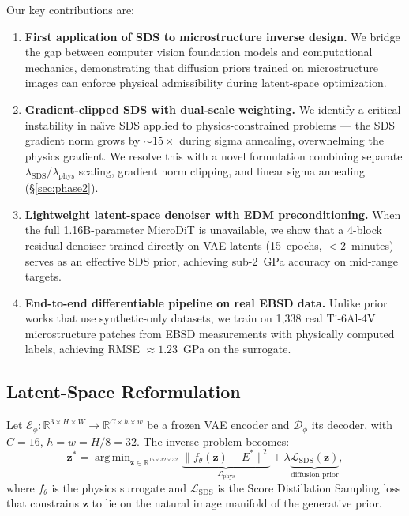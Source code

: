 \documentclass[12pt,a4paper]{article}
\newcommand{\R}{\mathbb{R}}
\newcommand{\loss}{\mathcal{L}}
\newcommand{\Etar}{E^{*}}
\newcommand{\zvec}{\bm{z}}
\DeclareMathOperator*{\argmin}{arg\,min}
\theoremstyle{definition}
\begin{document}
Our key contributions are:
\begin{enumerate}[nosep]
  \item \textbf{First application of SDS to microstructure inverse design.}
    We bridge the gap between computer vision foundation models and
    computational mechanics, demonstrating that diffusion priors trained
    on microstructure images can enforce physical admissibility during
    latent-space optimization.

  \item \textbf{Gradient-clipped SDS with dual-scale weighting.}
    We identify a critical instability in na\"{\i}ve SDS applied to
    physics-constrained problems --- the SDS gradient norm grows by
    $\sim\!15\times$ during sigma annealing, overwhelming the physics
    gradient.  We resolve this with a novel formulation combining
    separate $\lambda_{\mathrm{SDS}} / \lambda_{\mathrm{phys}}$ scaling,
    gradient norm clipping, and linear sigma annealing
    (\S\ref{sec:phase2}).

  \item \textbf{Lightweight latent-space denoiser with EDM preconditioning.}
    When the full 1.16B-parameter MicroDiT is unavailable, we show that
    a 4-block residual denoiser trained directly on VAE latents (15~epochs,
    $<$2~minutes) serves as an effective SDS prior, achieving
    sub-2~GPa accuracy on mid-range targets.

  \item \textbf{End-to-end differentiable pipeline on real EBSD data.}
    Unlike prior works that use synthetic-only datasets, we train on
    1{,}338 real Ti-6Al-4V microstructure patches from EBSD measurements
    with physically computed labels, achieving RMSE $\approx 1.23$~GPa
    on the surrogate.
\end{enumerate}

\subsection{Latent-Space Reformulation}

Let $\mathcal{E}_\phi : \R^{3 \times H \times W} \to \R^{C \times h \times w}$
be a frozen VAE encoder and $\mathcal{D}_\phi$ its decoder, with
$C=16$, $h=w=H/8=32$.  The inverse problem becomes:
\begin{equation}
  \zvec^{*} = \argmin_{\zvec \in \R^{16 \times 32 \times 32}}
  \underbrace{\bigl\| f_\theta(\zvec) - \Etar \bigr\|^2}_{\loss_{\mathrm{phys}}}
  + \lambda \underbrace{\loss_{\mathrm{SDS}}(\zvec)}_{\text{diffusion prior}},
  \label{eq:latent_inverse}
\end{equation}
where $f_\theta$ is the physics surrogate and $\loss_{\mathrm{SDS}}$ is the
Score Distillation Sampling loss that constrains $\zvec$ to lie on the
natural image manifold of the generative prior.
\end{document}
